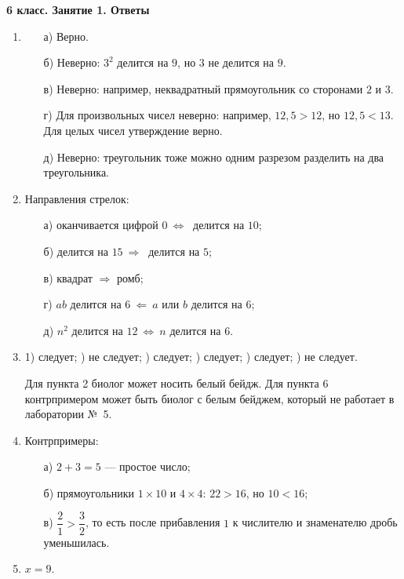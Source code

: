 \begin{center}
    {\large\bfseries 6 класс. Занятие 1. Ответы}
\end{center}

\footnotesize

\begin{enumerate}[itemsep=0.7em]

\item
\begin{enumerate}[label={},leftmargin=1.7em,itemsep=0.35em]
\item[а)] Верно.
\item[б)] Неверно: $3^2$ делится на $9$, но $3$ не делится на $9$.
\item[в)] Неверно: например, неквадратный прямоугольник со сторонами $2$ и $3$.
\item[г)] Для произвольных чисел неверно: например, $12{,}5>12$, но
$12{,}5<13$. Для целых чисел утверждение верно.
\item[д)] Неверно: треугольник тоже можно одним разрезом разделить на два
треугольника.
\end{enumerate}

\item Направления стрелок:
\begin{enumerate}[label={},leftmargin=1.7em,itemsep=0.35em]
\item[а)] оканчивается цифрой $0\ \Longleftrightarrow\ $ делится на $10$;
\item[б)] делится на $15\ \Longrightarrow\ $ делится на $5$;
\item[в)] квадрат $\Longrightarrow$ ромб;
\item[г)] $ab$ делится на $6\ \Longleftarrow\ a$ или $b$ делится на $6$;
\item[д)] $n^2$ делится на $12\ \Longleftrightarrow\ n$ делится на $6$.
\end{enumerate}

\item 1) следует; ) не следует; ) следует; ) следует; ) следует; ) не следует.

Для пункта 2 биолог может носить белый бейдж. Для пункта 6 контрпримером
может быть биолог с белым бейджем, который не работает в лаборатории №~5.

\item Контрпримеры:
\begin{enumerate}[label={},leftmargin=1.7em,itemsep=0.35em]
\item[а)] $2+3=5$ --- простое число;
\item[б)] прямоугольники $1\times10$ и $4\times4$: $22>16$, но $10<16$;
\item[в)] $\dfrac21>\dfrac32$, то есть после прибавления $1$ к числителю
и знаменателю дробь уменьшилась.
\end{enumerate}

\item $x=9$.

\end{enumerate}

